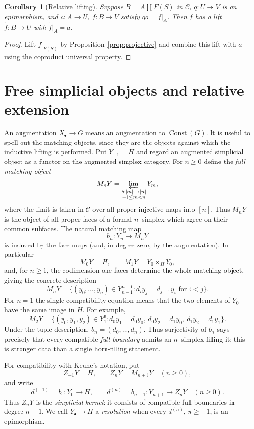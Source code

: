 \documentclass[10pt,a4paper]{amsart}
\newtheorem{corollary}[theorem]{Corollary}
\newcommand{\C}{\mathcal C}
\newcommand{\Const}{\operatorname{Const}}
\begin{document}
\begin{corollary}[Relative lifting]\label{cor:relative}
Suppose $B=A\amalg F(S)$ in $\C$, $q:U\twoheadrightarrow V$ is an
epimorphism, and $a:A\to U$, $f:B\to V$ satisfy $qa=f|_A$.
Then $f$ has a lift $\widetilde f:B\to U$ with $\widetilde f|_A=a$.
\end{corollary}
\begin{proof}
Lift $f|_{F(S)}$ by Proposition~\ref{prop:projective} and combine this
lift with $a$ using the coproduct universal property.
\end{proof}

\section{Free simplicial objects and relative extension}

An augmentation $X_\bullet\to G$ means an augmentation to
$\Const(G)$. It is useful to spell out the matching objects, since they
are the objects against which the inductive lifting is performed. Put
$Y_{-1}=H$ and regard an augmented simplicial object as a functor on the
augmented simplex category. For $n\geq0$ define the \emph{full matching
object}
\[
 M_nY=\varprojlim_{\substack{\delta:[m]\hookrightarrow[n]\\-1\leq m<n}}Y_m,
\]
where the limit is taken in $\C$ over all proper injective maps into
$[n]$. Thus $M_nY$ is the object of all proper faces of a formal
$n$--simplex which agree on their common subfaces. The natural matching
map
\[
 b_n:Y_n\longrightarrow M_nY
\]
is induced by the face maps (and, in degree zero, by the augmentation).
In particular
\[
 M_0Y=H,\qquad M_1Y=Y_0\times_HY_0,
\]
and, for $n\geq1$, the codimension-one faces determine the whole
matching object, giving the concrete description
\[
 M_nY=\{(y_0,\ldots,y_n)\in Y_{n-1}^{n+1}:
              d_i y_j=d_{j-1}y_i\text{ for }i<j\}.
\]
For $n=1$ the single compatibility equation means that the two elements
of $Y_0$ have the same image in $H$. For example,
\[
 M_2Y=\{(y_0,y_1,y_2)\in Y_1^3:
 d_0y_1=d_0y_0,\ d_0y_2=d_1y_0,\ d_1y_2=d_1y_1\}.
\]
Under the tuple description, $b_n=(d_0,\ldots,d_n)$. Thus surjectivity
of $b_n$ says precisely that every compatible \emph{full boundary}
admits an $n$--simplex filling it; this is stronger data than a single
horn-filling statement.

For compatibility with Keune's notation, put
\[
 Z_{-1}Y=H,\qquad Z_nY=M_{n+1}Y\quad(n\geq0),
\]
and write
\[
 d^{(-1)}=b_0:Y_0\longrightarrow H,\qquad
 d^{(n)}=b_{n+1}:Y_{n+1}\longrightarrow Z_nY\quad(n\geq0).
\]
Thus $Z_nY$ is the \emph{simplicial kernel}: it consists of compatible
full boundaries in degree $n+1$. We call $Y_\bullet\to H$ a
\emph{resolution} when every $d^{(n)}$, $n\geq-1$, is an epimorphism.
\end{document}

